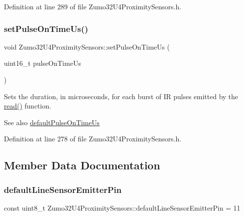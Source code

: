 Definition at line 289 of file Zumo32\+U4\+Proximity\+Sensors.\+h.

\mbox{\label{class_zumo32_u4_proximity_sensors_aeb626f226420976e774d93dd2a83e768}} 
\subsubsection{\texorpdfstring{set\+Pulse\+On\+Time\+Us()}{setPulseOnTimeUs()}}
{\footnotesize\ttfamily void Zumo32\+U4\+Proximity\+Sensors\+::set\+Pulse\+On\+Time\+Us (\begin{DoxyParamCaption}\item[{uint16\+\_\+t}]{pulse\+On\+Time\+Us }\end{DoxyParamCaption})\hspace{0.3cm}{\ttfamily [inline]}}



Sets the duration, in microseconds, for each burst of IR pulses emitted by the \hyperlink{class_zumo32_u4_proximity_sensors_a071d935e10e2a16a3ae2559d16a12683}{read()} function. 

\begin{DoxySeeAlso}{See also}
\hyperlink{class_zumo32_u4_proximity_sensors_a6d47a41b45a7088916fbeaa5b38c60b3}{default\+Pulse\+On\+Time\+Us} 
\end{DoxySeeAlso}


Definition at line 278 of file Zumo32\+U4\+Proximity\+Sensors.\+h.



\subsection{Member Data Documentation}
\mbox{\label{class_zumo32_u4_proximity_sensors_a7d6a79ab499972b36c52d2a8c03fe0f7}} 
\subsubsection{\texorpdfstring{default\+Line\+Sensor\+Emitter\+Pin}{defaultLineSensorEmitterPin}}
{\footnotesize\ttfamily const uint8\+\_\+t Zumo32\+U4\+Proximity\+Sensors\+::default\+Line\+Sensor\+Emitter\+Pin = 11\hspace{0.3cm}{\ttfamily [static]}}



